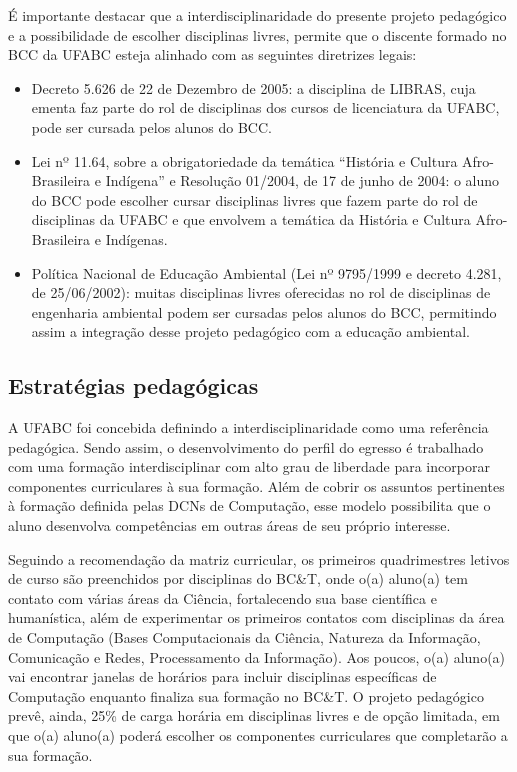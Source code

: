 É importante destacar que a interdisciplinaridade do presente projeto
pedagógico e a possibilidade de escolher disciplinas livres, permite que o
discente formado no BCC da UFABC esteja alinhado com as seguintes diretrizes
legais:
\begin{itemize}
    \item Decreto 5.626 de 22 de Dezembro de 2005: a disciplina de LIBRAS, cuja
    ementa faz parte do rol de disciplinas dos cursos de licenciatura da UFABC,
    pode ser cursada pelos alunos do BCC.
    
    \item Lei nº 11.64, sobre a obrigatoriedade da temática ``História e
    Cultura Afro-Brasileira e Indígena'' e Resolução 01/2004, de 17 de junho de
    2004: o aluno do BCC pode escolher cursar disciplinas livres que fazem
    parte do rol de disciplinas da UFABC e que envolvem a temática da História
    e Cultura Afro-Brasileira e Indígenas.
    
    \item Política Nacional de Educação Ambiental (Lei nº 9795/1999 e decreto
    4.281, de 25/06/2002): muitas disciplinas livres oferecidas no rol de
    disciplinas de engenharia ambiental podem ser cursadas pelos alunos do BCC,
    permitindo assim a integração desse projeto pedagógico com a educação
    ambiental.
\end{itemize}



\subsection{Estratégias pedagógicas}

A UFABC foi concebida definindo a interdisciplinaridade como uma referência
pedagógica.
Sendo assim, o desenvolvimento do perfil do egresso é trabalhado com uma
formação interdisciplinar com alto grau de liberdade para incorporar
componentes curriculares à sua formação.
Além de cobrir os assuntos pertinentes à formação definida pelas DCNs de
Computação, esse modelo possibilita que o aluno desenvolva competências em
outras áreas de seu próprio interesse.

Seguindo a recomendação da matriz curricular, os primeiros quadrimestres
letivos de curso são preenchidos por disciplinas do BC\&T, onde o(a) aluno(a)
tem contato com várias áreas da Ciência, fortalecendo sua base científica e
humanística, além de experimentar os primeiros contatos com disciplinas da área
de Computação (Bases Computacionais da Ciência, Natureza da Informação,
Comunicação e Redes, Processamento da Informação).
Aos poucos, o(a) aluno(a) vai encontrar janelas de horários para incluir
disciplinas específicas de Computação enquanto finaliza sua formação no BC\&T.
O projeto pedagógico prevê, ainda, 25\% de carga horária em disciplinas livres
e de opção limitada, em que o(a) aluno(a) poderá escolher os componentes
curriculares que completarão a sua formação.

